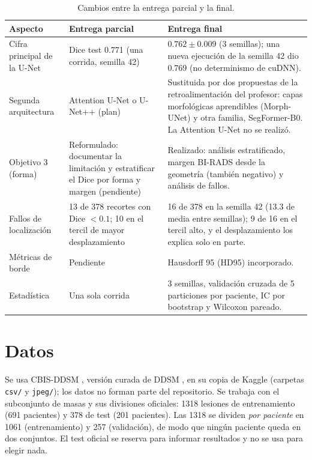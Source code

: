 \documentclass[11pt,a4paper]{article}
\begin{document}
\begin{table}[H]
\centering\small
\caption{Cambios entre la entrega parcial y la final.}
\label{tab:cambios}
\begin{tabular}{p{3.3cm}p{5.4cm}p{6cm}}
\toprule
Aspecto & Entrega parcial & Entrega final \\
\midrule
Cifra principal de la U-Net & Dice test 0.771 (una corrida, semilla 42) & $0.762 \pm 0.009$ (3 semillas); una nueva ejecución de la semilla 42 dio 0.769 (no determinismo de cuDNN). \\
Segunda arquitectura & Attention U-Net o U-Net++ (plan) & Sustituida por dos propuestas de la retroalimentación del profesor: capas morfológicas aprendibles (Morph-UNet) y otra familia, SegFormer-B0. La Attention U-Net no se realizó. \\
Objetivo 3 (forma) & Reformulado: documentar la limitación y estratificar el Dice por forma y margen (pendiente) & Realizado: análisis estratificado, margen BI-RADS desde la geometría (también negativo) y análisis de fallos. \\
Fallos de localización & 13 de 378 recortes con Dice $<0.1$; 10 en el tercil de mayor desplazamiento & 16 de 378 en la semilla 42 (13.3 de media entre semillas); 9 de 16 en el tercil alto, y el desplazamiento los explica solo en parte. \\
Métricas de borde & Pendiente & Hausdorff 95 (HD95) incorporado. \\
Estadística & Una sola corrida & 3 semillas, validación cruzada de 5 particiones por paciente, IC por bootstrap y Wilcoxon pareado. \\
\bottomrule
\end{tabular}
\end{table}

\section{Datos}
Se usa CBIS-DDSM \citep{lee2017cbisddsm}, versión curada de DDSM \citep{heath2001ddsm}, en su copia de Kaggle (carpetas \texttt{csv/} y \texttt{jpeg/}); los datos no forman parte del repositorio. Se trabaja con el subconjunto de masas y sus divisiones oficiales: 1318 lesiones de entrenamiento (691 pacientes) y 378 de test (201 pacientes). Las 1318 se dividen \emph{por paciente} en 1061 (entrenamiento) y 257 (validación), de modo que ningún paciente queda en dos conjuntos. El test oficial se reserva para informar resultados y no se usa para elegir nada.
\end{document}
